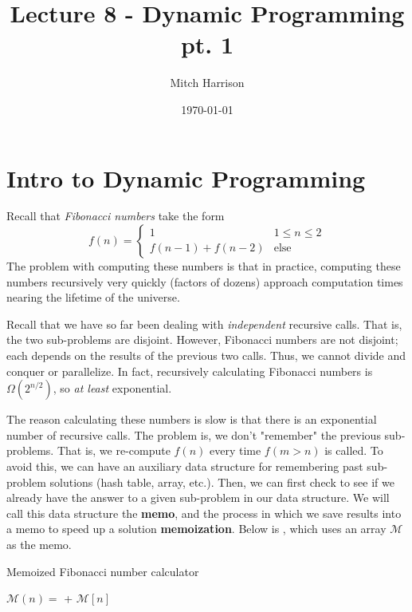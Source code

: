 \documentclass[titlepage, 12pt, leqno]{article}
\title{\Huge{Lecture 8 - Dynamic Programming pt. 1}}
\author{\large{Mitch Harrison}}
\date{\today}
\begin{document}
\setlength{\parskip}{1\baselineskip}
\setlength{\parindent}{15pt}
\maketitle
\tableofcontents
\newpage


\section{Intro to Dynamic Programming}

Recall that \textit{Fibonacci numbers} take the form
\[
f(n) = 
\begin{cases}
    1 & 1 \le n \le 2 \\
    f(n-1) + f(n-2) & \text{else}
\end{cases}
\]
The problem with computing these numbers is that in practice, computing
these numbers recursively very quickly (factors of dozens) approach computation
times nearing the lifetime of the universe. 

Recall that we have so far been dealing with \textit{independent} recursive 
calls. That is, the two sub-problems are disjoint. However, Fibonacci numbers
are not disjoint; each depends on the results of the previous two calls. Thus,
we cannot divide and conquer or parallelize. In fact, recursively calculating
Fibonacci numbers is $\Omega(2^{n/2})$, so \textit{at least} exponential.

The reason calculating these numbers is slow is that there is an exponential
number of recursive calls. The problem is, we don't "remember" the previous 
sub-problems. That is, we re-compute $f(n)$ every time $f(m>n)$ is called. To
avoid this, we can have an auxiliary data structure for remembering past
sub-problem solutions (hash table, array, etc.). Then, we can first check to
see if we already have the answer to a given sub-problem in our data structure.
We will call this data structure the \textbf{memo}, and the process in which
we save results into a memo to speed up a solution \textbf{memoization}. Below
is , which uses an array $\mathcal{M}$ as the memo.

\begin{algorithm}
\caption{Memoized Fibonacci number calculator}
\begin{algorithmic}[1]
        \State {}
    \Else
            \State $\mathcal{M}(n) = $  + 
        \EndIf
        \State \Return $\mathcal{M}[n]$
    \EndIf
\EndProcedure 
\end{algorithmic}
\end{algorithm}
\end{document}
